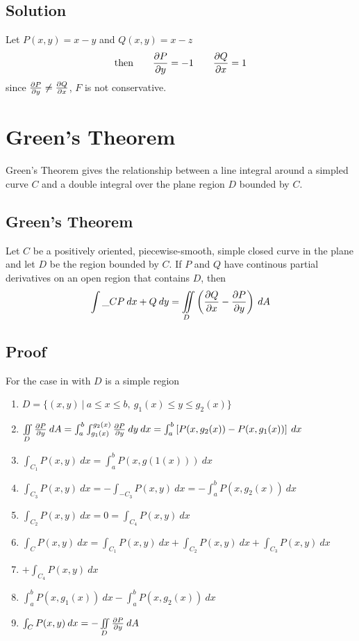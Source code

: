 \subsection*{Solution}
Let $P(x,y)=x-y$ and $Q(x,y)=x-z$
$$\text{then} \qquad \pdv{P}{y}=-1 \qquad \pdv{Q}{x}=1$$
since $\pdv{P}{y}\neq\pdv{Q}{x}$, $F$ is not conservative.

\section{Green's Theorem}
Green's Theorem gives the relationship between a line integral around a simpled
curve $C$ and a double integral over the plane region $D$ bounded by $C$.

\subsection*{Green's Theorem}
Let $C$ be a positively oriented, piecewise-smooth, simple closed curve in the plane
and let $D$ be the region bounded by $C$. If $P$ and $Q$ have continous partial derivatives
on an open region that contains $D$, then
$$\int\_C P\:dx+Q\:dy=\iint\limits_D\left(\pdv{Q}{x}-\pdv{P}{y}\right)\:dA$$

\subsection*{Proof}
For the case in with $D$ is a simple region
\begin{enumerate}
        \item[] $D=\{(x,y)\:|\:a\leq x\leq b,\:g_1(x)\leq y\leq g_2(x)\}$
        \item[] $\iint\limits_D \pdv{P}{y}\:dA=\int_a^b\int_{g_1(x)}^{g_2(x)}\pdv{P}{y}(x,y)\:dy\:dx=
                      \int_a^b \left[P(x,g_2(x))-P(x,g_1(x))\right]\:dx$
        \item[] $\int_{C_1} P(x,y)\:dx=\int_a^b P(x,g(1(x)))\:dx$
        \item[] $\int_{C_3} P(x,y)\:dx=-\int_{-C_3} P(x,y)\:dx=-\int_a^b P(x,g_2(x))\:dx$
        \item[] $\int_{C_2} P(x,y)\:dx=0=\int_{C_4} P(x,y)\:dx$
        \item[] $\int_C P(x,y)\:dx=\int_{C_1} P(x,y)\:dx+\int_{C_2} P(x,y)\:dx+\int_{C_3} P(x,y)\:dx$
        \item[] $+\int_{C_4} P(x,y)\:dx$
        \item[] $\int_a^b P(x,g_1(x))\:dx-\int_a^b P(x,g_2(x))\:dx$
        \item[] $\int_C P(x,y)\:dx=-\iint\limits_D \pdv{P}{y}\:dA$
\end{enumerate}


